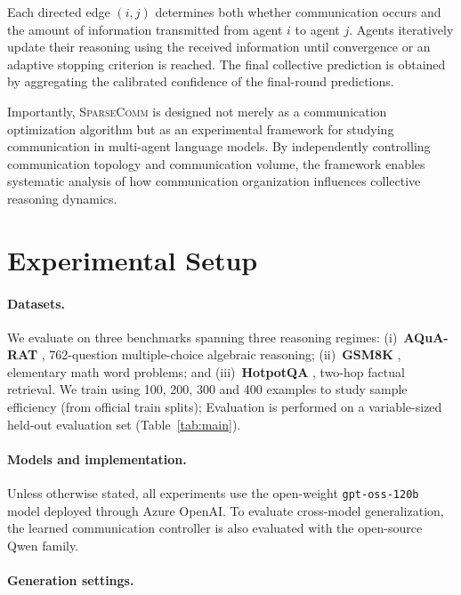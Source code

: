 \documentclass[11pt]{article}
\newcommand{\sys}{\textsc{SparseComm}\xspace}
\begin{document}
Each directed edge $(i,j)$ determines both whether communication occurs and the amount of information transmitted from agent $i$ to agent $j$. Agents iteratively update their reasoning using the received information until convergence or an adaptive stopping criterion is reached. The final collective prediction is obtained by aggregating the calibrated confidence of the final-round predictions.

Importantly, \sys{} is designed not merely as a communication optimization algorithm but as an experimental framework for studying communication in multi-agent language models. By independently controlling communication topology and communication volume, the framework enables systematic analysis of how communication organization influences collective reasoning dynamics.
\section{Experimental Setup}
\label{sec:experiments}

\paragraph{Datasets.}
We evaluate on three benchmarks spanning three reasoning regimes:
(i)~\textbf{AQuA-RAT} \citep{ling-etal-2017-program}, 762-question multiple-choice
algebraic reasoning;
(ii)~\textbf{GSM8K} \citep{cobbe2021trainingverifierssolvemath}, elementary math word problems;
and
(iii)~\textbf{HotpotQA} \citep{yang-etal-2018-hotpotqa}, two-hop factual
retrieval.
We train using 100, 200, 300 and 400 examples to study sample efficiency (from official train splits);
Evaluation is performed on a variable-sized held-out evaluation set (Table~\ref{tab:main}).

\paragraph{Models and implementation.}

Unless otherwise stated, all experiments use the open-weight \texttt{gpt-oss-120b} \citep{openai2025gptoss120bgptoss20bmodel} model deployed through Azure OpenAI.
To evaluate cross-model generalization, the learned communication controller is
also evaluated with the open-source Qwen family.

\paragraph{Generation settings.}
\end{document}
